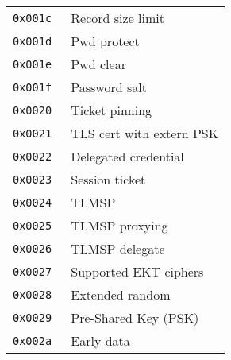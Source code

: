 \documentclass[documentation]{subfiles}
\begin{document}
\begin{minipage}{.48\textwidth}
\begin{longtable}{>{\tt}rl}
        0x001c & Record size limit\\
        0x001d & Pwd protect\\
        0x001e & Pwd clear\\
        0x001f & Password salt\\
        0x0020 & Ticket pinning\\
        0x0021 & TLS cert with extern PSK\\
        0x0022 & Delegated credential\\
        0x0023 & Session ticket\\
        0x0024 & TLMSP\\
        0x0025 & TLMSP proxying\\
        0x0026 & TLMSP delegate\\
        0x0027 & Supported EKT ciphers\\
        0x0028 & Extended random\\
        0x0029 & Pre-Shared Key (PSK)\\
        0x002a & Early data\\
        \bottomrule
    \end{longtable}
\end{minipage}
\hfill
\end{document}
